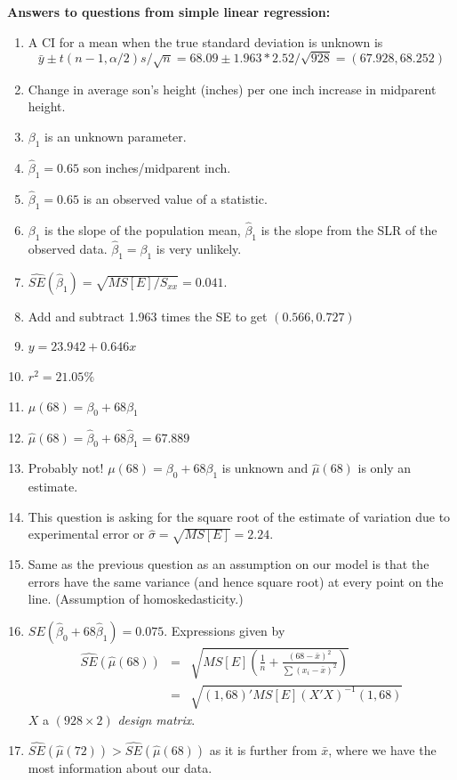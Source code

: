 \newpage

\textbf{Answers to questions from simple linear regression:}
\begin{enumerate}
\item A CI for a mean when the true standard deviation is unknown is 
$$\bar{y}\pm t(n-1,\alpha/2)s/\sqrt{n}= 68.09 \pm 1.963*2.52/\sqrt{928}=(67.928,68.252)$$
\item Change in average son's height (inches) per one inch increase in 
midparent height.
\item $\beta_1$ is an unknown parameter. 
\item $\hat\beta_1=0.65$ son inches/midparent inch.
\item $\hat\beta_1=0.65$ is an observed value of a statistic. 
\item 
$\beta_1$ is the slope of the population mean, 
$\hat\beta_1$ is the slope from the SLR of the observed data.
$\hat\beta_1=\beta_1$ is very unlikely.
\item $\widehat{SE}(\hat\beta_1) = \sqrt{MS[E]/S_{xx}}=0.041$.
\item Add and subtract 1.963 times the SE to get $(0.566,0.727)$
\item $y=23.942 + 0.646 x$
\item $r^2=21.05\%$
\item $\mu(68)=\beta_0+ 68 \beta_1$
\item $\hat{\mu}(68)=\hat\beta_0+68 \hat\beta_1=67.889$
\item Probably not! $\mu(68)=\beta_0+ 68 \beta_1$ is unknown and $\hat{\mu}(68)$ is only an estimate.
\item This question is asking for the square root of the estimate of variation due to experimental error or $\hat{\sigma}=\sqrt{MS[E]}=2.24$.
\item Same as the previous question as an assumption on our model is that the errors have the same variance (and hence square root) at every point on the line.  (Assumption of homoskedasticity.)
\item $SE(\hat\beta_0+ 68 \hat\beta_1)=0.075$.
Expressions given by
\begin{eqnarray*}
\widehat{SE}(\hat\mu(68)) &=& \sqrt{MS[E]\left(\frac{1}{n}+\frac{(68-\bar{x})^2}{\sum(x_i-\bar{x})^2}\right)}\\
&=& \sqrt{(1,68)' MS[E] (X'X)^{-1} (1,68)}
\end{eqnarray*}
$X$ a $(928 \times 2)$ {\em design matrix}.
\item $\widehat{SE}(\hat\mu(72)) > \widehat{SE}(\hat\mu(68))$ as it is further from $\bar{x}$, where we have the most information about our data.

\end{enumerate}
